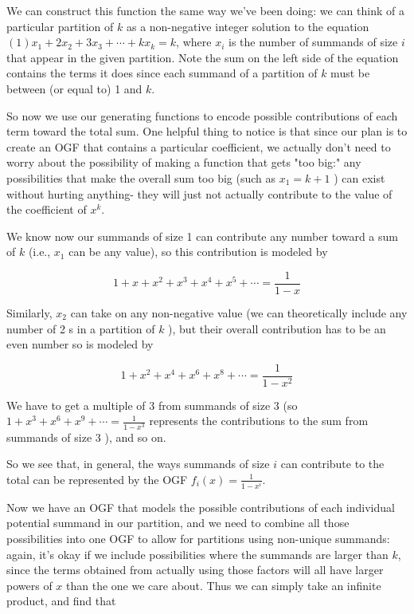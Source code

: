 \documentclass{article}
\theoremstyle{definition}
\begin{document}
We can construct this function the same way we've been doing: we can think of a particular partition of $k$ as a non-negative integer solution to the equation $(1) x_{1}+2 x_{2}+3 x_{3}+\cdots+k x_{k}=k$, where $x_{i}$ is the number of summands of size $i$ that appear in the given partition. Note the sum on the left side of the equation contains the terms it does since each summand of a partition of $k$ must be between (or equal to) 1 and $k$.

So now we use our generating functions to encode possible contributions of each term toward the total sum. One helpful thing to notice is that since our plan is to create an OGF that contains a particular coefficient, we actually don't need to worry about the possibility of making a function that gets "too big:" any possibilities that make the overall sum too big (such as $x_{1}=k+1$ ) can exist without hurting anything- they will just not actually contribute to the value of the coefficient of $x^{k}$.

We know now our summands of size 1 can contribute any number toward a sum of $k$ (i.e., $x_{1}$ can be any value), so this contribution is modeled by

$$
1+x+x^{2}+x^{3}+x^{4}+x^{5}+\cdots=\frac{1}{1-x}
$$

Similarly, $x_{2}$ can take on any non-negative value (we can theoretically include any number of 2 s in a partition of $k$ ), but their overall contribution has to be an even number so is modeled by

$$
1+x^{2}+x^{4}+x^{6}+x^{8}+\cdots=\frac{1}{1-x^{2}}
$$

We have to get a multiple of 3 from summands of size 3 (so $1+x^{3}+x^{6}+x^{9}+\cdots=\frac{1}{1-x^{3}}$ represents the contributions to the sum from summands of size 3 ), and so on.

So we see that, in general, the ways summands of size $i$ can contribute to the total can be represented by the OGF $f_{i}(x)=\frac{1}{1-x^{i}}$.

Now we have an OGF that models the possible contributions of each individual potential summand in our partition, and we need to combine all those possibilities into one OGF to allow for partitions using non-unique summands: again, it's okay if we include possibilities where the summands are larger than $k$, since the terms obtained from actually using those factors will all have larger powers of $x$ than the one we care about. Thus we can simply take an infinite product, and find that
\end{document}
